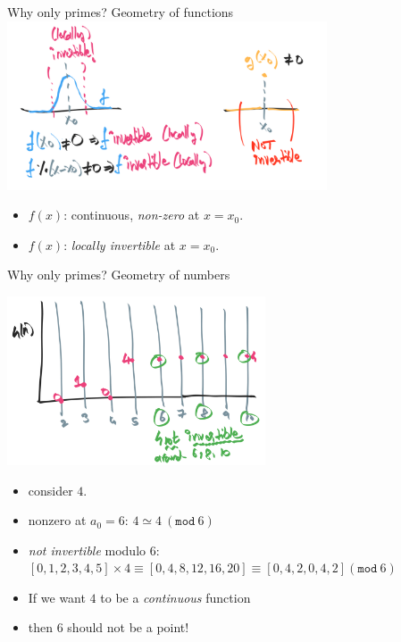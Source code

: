 \documentclass[8pt]{beamer}
\renewcommand{\mod}[1]{\left( \texttt{mod}~#1 \right)}
\begin{document}
\begin{frame}[fragile]{Why only primes? Geometry of functions}
\includegraphics[height=5cm]{./nonzero-fn-locally-invertible.png}\pause
\begin{itemize}
\item $f(x)$: continuous, \emph{non-zero} at $x = x_0$. \pause
\item $f(x)$: \emph{locally invertible} at $x = x_0$. \pause
\end{itemize}
\end{frame}

\begin{frame}[fragile]{Why only primes? Geometry of numbers}

\includegraphics[height=5cm]{./fn-4-on-naturals.png}
\begin{itemize}
\item consider $4$. \pause
\item nonzero at $a_0 = 6$: $4 \simeq 4~\mod{6}$\pause
\item \emph{not invertible} modulo $6$: $[0, 1, 2, 3, 4, 5] \times 4 \equiv [0, 4, 8, 12, 16, 20] \equiv [0, 4, 2, 0, 4, 2] \mod{6}$ \pause
\item If we want $4$ to be a \emph{continuous} function\pause
\item then 6 should not be a point!
\end{itemize}

\end{frame}
\end{document}
